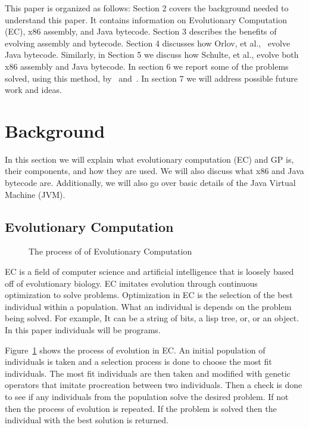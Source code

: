\documentclass{sig-alternate}
\begin{document}
This paper is organized as follows: Section 2 covers the background needed to understand this paper. It contains information on Evolutionary Computation (EC), x86 assembly, and Java bytecode. Section 3 describes the benefits of evolving assembly and bytecode. Section 4 discusses how Orlov, et al.,~\cite{FINCH:2011} evolve Java bytecode. Similarly, in Section 5 we discuss how Schulte, et al., evolve both x86 assembly and Java bytecode. In section 6 we report some of the problems solved, using this method, by~\cite{FINCH:2011} and~\cite{Assembly:2010}. In section 7 we will address possible future work and ideas.  
	
	

\section{Background}


In this section we will explain what evolutionary computation (EC) and GP is, their components, and how they are used. We will also discuss what x86 and Java bytecode are. Additionally, we will also go over basic details of the Java Virtual Machine (JVM).
\subsection{Evolutionary Computation}
\begin{figure}
\centering
{}

\caption{The process of of Evolutionary Computation}
\label{ECdiagram}
\end{figure}


EC is a field of computer science and artificial intelligence that is loosely based off of evolutionary biology. EC imitates evolution through continuous optimization to solve problems. Optimization in EC is the selection of the best individual within a population. What an individual is depends on the problem being solved. For example, It can be a string of bits, a lisp tree, or, or an object. In this paper individuals will be programs.\par 

Figure~\ref{ECdiagram} shows the process of evolution in EC. An initial population of individuals is taken and a selection process is done to choose the most fit individuals. The most fit individuals are then taken and modified with genetic operators that imitate procreation between two individuals. Then a check is done to see if any individuals from the population solve the desired problem. If not then the process of evolution is repeated. If the problem is solved then the individual with the best solution is returned.\par
\end{document}
